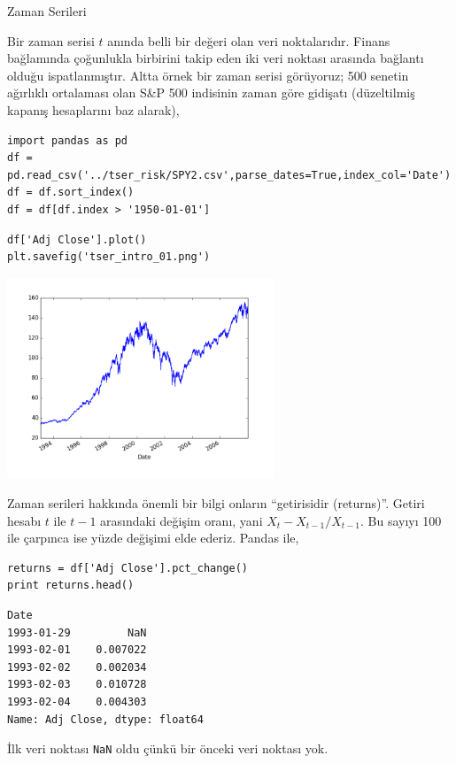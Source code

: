 \documentclass[12pt,fleqn]{article}\usepackage{../../common}
\begin{document}
Zaman Serileri 

Bir zaman serisi $t$ anında belli bir değeri olan veri noktalarıdır. Finans
bağlamında çoğunlukla birbirini takip eden iki veri noktası arasında bağlantı
olduğu ispatlanmıştır. Altta örnek bir zaman serisi görüyoruz; 500 senetin
ağırlıklı ortalaması olan S\&P 500 indisinin zaman göre gidişatı (düzeltilmiş
kapanış hesaplarını baz alarak),

\begin{verbatim}
import pandas as pd
df = pd.read_csv('../tser_risk/SPY2.csv',parse_dates=True,index_col='Date')
df = df.sort_index()
df = df[df.index > '1950-01-01']
\end{verbatim}

\begin{verbatim}
df['Adj Close'].plot()
plt.savefig('tser_intro_01.png')
\end{verbatim}

\includegraphics[height=6cm]{tser_intro_01.png}

Zaman serileri hakkında önemli bir bilgi onların ``getirisidir
(returns)''. Getiri hesabı $t$ ile $t-1$ arasındaki değişim oranı, yani
$X_{t}-X_{t-1}/X_{t-1}$. Bu sayıyı 100 ile çarpınca ise yüzde değişimi elde
ederiz. Pandas ile,

\begin{verbatim}
returns = df['Adj Close'].pct_change()
print returns.head()
\end{verbatim}

\begin{verbatim}
Date
1993-01-29         NaN
1993-02-01    0.007022
1993-02-02    0.002034
1993-02-03    0.010728
1993-02-04    0.004303
Name: Adj Close, dtype: float64
\end{verbatim}

İlk veri noktası \verb!NaN! oldu çünkü bir önceki veri noktası yok.
\end{document}
